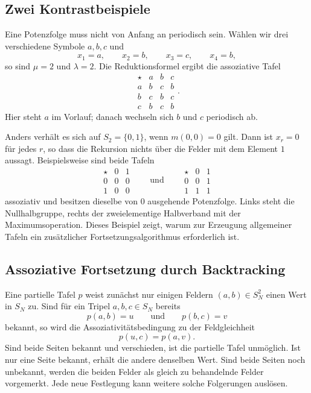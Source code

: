 \documentclass[main.tex]{subfiles}
\begin{document}
\subsection{Zwei Kontrastbeispiele}

Eine Potenzfolge muss nicht von Anfang an periodisch sein.  Wählen wir drei
verschiedene Symbole \(a,b,c\) und
\[
  x_1=a,\qquad x_2=b,\qquad x_3=c,\qquad x_4=b,
\]
so sind \(\mu=2\) und \(\lambda=2\).  Die Reduktionsformel ergibt die
assoziative Tafel
\[
\begin{array}{c|ccc}
\star&a&b&c\\\hline
a&b&c&b\\
b&c&b&c\\
c&b&c&b
\end{array}.
\]
Hier steht \(a\) im Vorlauf; danach wechseln sich \(b\) und \(c\) periodisch
ab.

Anders verhält es sich auf \(S_2=\{0,1\}\), wenn \(m(0,0)=0\) gilt.  Dann
ist \(x_r=0\) für jedes \(r\), so dass die Rekursion nichts über die Felder
mit dem Element \(1\) aussagt.  Beispielsweise sind beide Tafeln
\[
\begin{array}{c|cc}
\star&0&1\\\hline
0&0&0\\
1&0&0
\end{array}
\qquad\text{und}\qquad
\begin{array}{c|cc}
\star&0&1\\\hline
0&0&1\\
1&1&1
\end{array}
\]
assoziativ und besitzen dieselbe von \(0\) ausgehende Potenzfolge.  Links
steht die Nullhalbgruppe, rechts der zweielementige Halbverband mit der
Maximumsoperation.  Dieses Beispiel zeigt, warum zur Erzeugung allgemeiner
Tafeln ein zusätzlicher Fortsetzungsalgorithmus erforderlich ist.


\subsection{Assoziative Fortsetzung durch Backtracking}

Eine partielle Tafel \(p\) weist zunächst nur einigen Feldern
\((a,b)\in S_N^2\) einen Wert in \(S_N\) zu.  Sind für ein Tripel
\(a,b,c\in S_N\) bereits
\[
  p(a,b)=u
  \qquad\text{und}\qquad
  p(b,c)=v
\]
bekannt, so wird die Assoziativitätsbedingung zu der Feldgleichheit
\[
  \boxed{p(u,c)=p(a,v).}
\]
Sind beide Seiten bekannt und verschieden, ist die partielle Tafel
unmöglich.  Ist nur eine Seite bekannt, erhält die andere denselben Wert.
Sind beide Seiten noch unbekannt, werden die beiden Felder als gleich zu
behandelnde Felder vorgemerkt.  Jede neue Festlegung kann weitere solche
Folgerungen auslösen.
\end{document}

